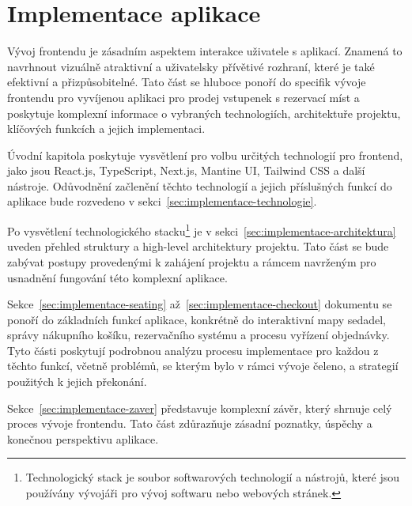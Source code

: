 \chapter{Implementace aplikace}
\label{ch:implementace}
Vývoj frontendu je zásadním aspektem interakce uživatele s aplikací.
Znamená to navrhnout vizuálně atraktivní a uživatelsky přívětivé rozhraní, které je také efektivní a přizpůsobitelné.
Tato část se hluboce ponoří do specifik vývoje frontendu pro vyvíjenou aplikaci pro prodej vstupenek s rezervací míst a poskytuje komplexní informace o vybraných technologiích, architektuře projektu, klíčových funkcích a jejich implementaci.

Úvodní kapitola poskytuje vysvětlení pro volbu určitých technologií pro frontend, jako jsou React.js, TypeScript, Next.js, Mantine UI, Tailwind CSS a další nástroje.
Odůvodnění začlenění těchto technologií a jejich příslušných funkcí do aplikace bude rozvedeno v sekci~\ref{sec:implementace-technologie}.

Po vysvětlení technologického stacku\footnote{Technologický stack je soubor softwarových technologií a nástrojů, které jsou používány vývojáři pro vývoj softwaru nebo webových stránek.} je v sekci~\ref{sec:implementace-architektura} uveden přehled struktury a high-level architektury projektu.
Tato část se bude zabývat postupy provedenými k zahájení projektu a rámcem navrženým pro usnadnění fungování této komplexní aplikace.

Sekce~\ref{sec:implementace-seating} až~\ref{sec:implementace-checkout} dokumentu se ponoří do základních funkcí aplikace, konkrétně do interaktivní mapy sedadel, správy nákupního košíku, rezervačního systému a procesu vyřízení objednávky.
Tyto části poskytují podrobnou analýzu procesu implementace pro každou z těchto funkcí, včetně problémů, se kterým bylo v rámci vývoje čeleno, a strategií použitých k jejich překonání.

Sekce~\ref{sec:implementace-zaver} představuje komplexní závěr, který shrnuje celý proces vývoje frontendu.
Tato část zdůrazňuje zásadní poznatky, úspěchy a konečnou perspektivu aplikace.
